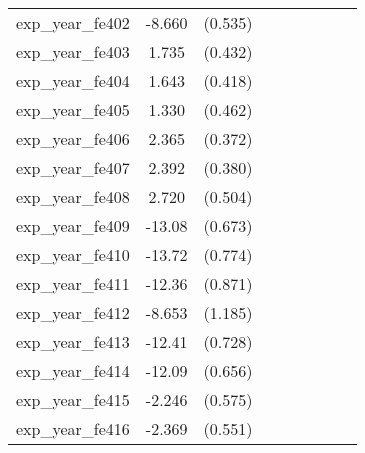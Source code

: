 {\begin{tabular}{l*{4}{cc}}
exp\_year\_fe402&   -8.660\sym{***}&  (0.535)&                  &         &                  &         &                  &         \\
exp\_year\_fe403&    1.735\sym{***}&  (0.432)&                  &         &                  &         &                  &         \\
exp\_year\_fe404&    1.643\sym{***}&  (0.418)&                  &         &                  &         &                  &         \\
exp\_year\_fe405&    1.330\sym{**} &  (0.462)&                  &         &                  &         &                  &         \\
exp\_year\_fe406&    2.365\sym{***}&  (0.372)&                  &         &                  &         &                  &         \\
exp\_year\_fe407&    2.392\sym{***}&  (0.380)&                  &         &                  &         &                  &         \\
exp\_year\_fe408&    2.720\sym{***}&  (0.504)&                  &         &                  &         &                  &         \\
exp\_year\_fe409&   -13.08\sym{***}&  (0.673)&                  &         &                  &         &                  &         \\
exp\_year\_fe410&   -13.72\sym{***}&  (0.774)&                  &         &                  &         &                  &         \\
exp\_year\_fe411&   -12.36\sym{***}&  (0.871)&                  &         &                  &         &                  &         \\
exp\_year\_fe412&   -8.653\sym{***}&  (1.185)&                  &         &                  &         &                  &         \\
exp\_year\_fe413&   -12.41\sym{***}&  (0.728)&                  &         &                  &         &                  &         \\
exp\_year\_fe414&   -12.09\sym{***}&  (0.656)&                  &         &                  &         &                  &         \\
exp\_year\_fe415&   -2.246\sym{***}&  (0.575)&                  &         &                  &         &                  &         \\
exp\_year\_fe416&   -2.369\sym{***}&  (0.551)&                  &         &                  &         &                  &         \\

\end{tabular}}
